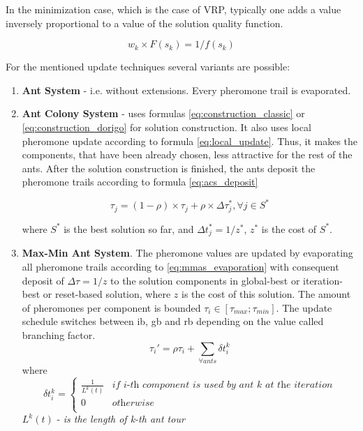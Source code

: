 \documentclass[12pt,a4paper,oneside]{book}
\begin{document}
In the minimization case, which is the case of VRP, typically one adds a value inversely proportional to a value of the solution quality function.

\begin{equation}
w_k \times F(s_k) = 1 / f(s_k)
\end{equation}


For the mentioned update techniques several variants are possible: \\

\begin{enumerate}
\item {\textbf{Ant System} - i.e. without extensions. Every pheromone trail is evaporated.}

\item {\textbf{Ant Colony System} - uses formulas \eqref{eq:construction_classic} or \eqref{eq:construction_dorigo} for solution construction. It also uses local pheromone update according to formula \eqref{eq:local_update}. Thus, it makes the components, that have been already chosen, less attractive for the rest of the ants. After the solution construction is finished, the ants deposit the pheromone trails according to formula \eqref{eq:acs_deposit}}

\begin{equation}
\tau_j = (1 - \rho) \times \tau_j + \rho \times \Delta \tau_j^*, \forall j \in S^*
\label{eq:acs_deposit}
\end{equation}

where $S^*$ is the best solution so far, and $\Delta t_j^* = 1/z^*$, $z^*$ is the cost of $S^*$.

\item \textbf{Max-Min Ant System}. The pheromone values are updated by evaporating all pheromone trails according to \eqref{eq:mmas_evaporation} with consequent deposit of $\Delta \tau = 1 / z$ to the solution components in global-best or iteration-best or reset-based solution, where $z$ is the cost of this solution. The amount of pheromones per component is bounded $\tau_i \in [\tau_{max};\tau_{min}]$. The update schedule switches between ib, gb and rb depending on the value called branching factor.
\begin{equation}
\tau_i' = \rho \tau_i + \sum \limits_{\forall ants} \delta t_i^k
\end{equation}
where
\[
\delta t_i^k =
\left\{
\begin{array}{ll}
      \frac{1}{L^k(t)} & \textit{if i-th component is used by ant k at the iteration}\\
      0 & \textit{otherwise} \\
\end{array} 
\right. 
\]
$L^k(t)$ - \textit{is the length of k-th ant tour}



\end{enumerate}
\end{document}

